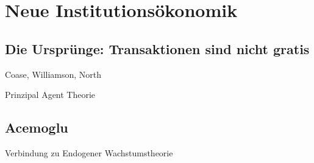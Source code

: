 %
%
%

\chapter{Neue Institutionsökonomik}
\label{Neue Institut}

\section{Die Ursprünge: Transaktionen sind nicht gratis} \label{sec: Neue Inst}
Coase, Williamson, North

Prinzipal Agent Theorie


\section{Acemoglu}
Verbindung zu Endogener Wachstumstheorie

